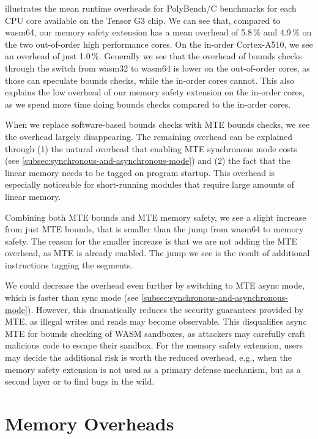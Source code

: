  illustrates the mean runtime overheads for PolyBench/C benchmarks for each CPU core available on the Tensor G3 chip.
We can see that, compared to wasm64, our memory safety extension has a mean overhead of 5.8\,\% and 4.9\,\% on the two out-of-order high performance cores.
On the in-order Cortex-A510, we see an overhead of just 1.0\,\%.
Generally we see that the overhead of bounds checks through the switch from wasm32 to wasm64 is lower on the out-of-order cores, as those can speculate bounds checks, while the in-order cores cannot.
This also explains the low overhead of our memory safety extension on the in-order cores, as we spend more time doing bounds checks compared to the in-order cores.

When we replace software-based bounds checks with \ac{MTE} bounds checks, we see the overhead largely disappearing.
The remaining overhead can be explained through (1) the natural overhead that enabling \ac{MTE} synchronous mode costs (see \cref{subsec:synchronous-and-asynchronous-mode}) and (2) the fact that the linear memory needs to be tagged on program startup.
This overhead is especially noticeable for short-running modules that require large amounts of linear memory.

Combining both \ac{MTE} bounds and \ac{MTE} memory safety, we see a slight increase from just \ac{MTE} bounds, that is smaller than the jump from wasm64 to memory safety.
The reason for the smaller increase is that we are not adding the \ac{MTE} overhead, as \ac{MTE} is already enabled.
The jump we see is the result of additional instructions tagging the segments.

We could decrease the overhead even further by switching to \ac{MTE} async mode, which is faster than sync mode (see \cref{subsec:synchronous-and-asynchronous-mode}).
However, this dramatically reduces the security guarantees provided by \ac{MTE}, as illegal writes and reads may become observable.
This disqualifies async \ac{MTE} for bounds checking of \ac{WASM} sandboxes, as attackers may carefully craft malicious code to escape their sandbox.
For the memory safety extension, users may decide the additional risk is worth the reduced overhead, e.g., when the memory safety extension is not used as a primary defense mechanism, but as a second layer or to find bugs in the wild.

\section{Memory Overheads}\label{sec:memory-overheads}

